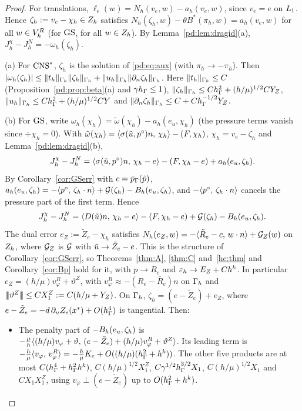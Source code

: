 \begin{proof}
For translations, $\ell_e(w)=N_h(v_e,w)-a_h(v_e,w)$, since $v_e=e$ on $L_1$. Hence $\zeta_h:=v_e-\chi_h\in Z_h$ satisfies $N_h(\zeta_h,w)-\theta B^\ast(\pi_h,w)=a_h(v_e,w)$ for all $w\in V_h^R$ (for $\mathrm{GS}$, for all $w\in Z_h$). By Lemma~\ref{pd:lem:dragid}(a), $J^\chi_h-J^N_h=-\omega_h(\zeta_h)$.

(a) For $\mathrm{CNS}^\ast$, $\zeta_h$ is the solution of \eqref{pd:eq:aux} (with $\pi_h\to-\pi_h$). Then $|\omega_h(\zeta_h)|\le\lVert t_h\rVert_{\Gamma_h}\lVert \zeta_h\rVert_{\Gamma_h}+\lVert u_h\rVert_{\Gamma_h}\lVert \partial_n\zeta_h\rVert_{\Gamma_h}$. Here $\lVert t_h\rVert_{\Gamma_h}\le C$ (Proposition~\ref{pd:prop:beta}(a) and $\gamma h_\Gamma\le1$), $\lVert \zeta_h\rVert_{\Gamma_h}\le Ch_\Gamma^2+(h/\mu)^{1/2}CY_Z$, $\lVert u_h\rVert_{\Gamma_h}\le Ch_\Gamma^2+(h/\mu)^{1/2}CY$ and $\lVert \partial_n\zeta_h\rVert_{\Gamma_h}\le C+Ch_\Gamma^{-1/2}Y_Z$.

(b) For $\mathrm{GS}$, write $\omega_h(\chi_h)=\tilde\omega(\chi_h)-a_h(e_u,\chi_h)$ (the pressure terms vanish since $\div\chi_h=0$). With $\tilde\omega(\chi_h)=\langle \sigma(\tilde u,p^\circ)n,\, \chi_h\rangle-(F,\chi_h)$, $\chi_h=v_e-\zeta_h$ and Lemma~\ref{pd:lem:dragid}(b),
\[
J^\chi_h-J^N_h=\langle \sigma(\tilde u,p^\circ)n,\, \chi_h-e\rangle-(F,\chi_h-e)+a_h(e_u,\zeta_h).
\]
By Corollary~\ref{cor:GSerr} with $c=\bar p_{\Gamma}(\tilde p)$, $a_h(e_u,\zeta_h)=-\langle p^\circ,\, \zeta_h\cdot n\rangle+\mathcal G(\zeta_h)-B_h(e_u,\zeta_h)$, and $-\langle p^\circ,\, \zeta_h\cdot n\rangle$ cancels the pressure part of the first term. Hence
\[
J^\chi_h-J^N_h=\langle D(\tilde u)n,\, \chi_h-e\rangle-(F,\chi_h-e)+\mathcal G(\zeta_h)-B_h(e_u,\zeta_h).
\]
The dual error $e_Z:=\tilde Z_e-\chi_h$ satisfies $N_h(e_Z,w)=-\langle \tilde R_e-c,\, w\cdot n\rangle+\mathcal G_Z(w)$ on $Z_h$, where $\mathcal G_Z$ is $\mathcal G$ with $\tilde u\to\tilde Z_e-e$. This is the structure of Corollary~\ref{cor:GSerr}, so Theorems~\ref{thm:A}, \ref{thm:C} and~\ref{hc:thm} and Corollary~\ref{cor:Bp} hold for it, with $p\to R_e$ and $\varepsilon_h\to E_Z+Ch^k$. In particular $e_Z=(h/\mu)v^R_\varphi+\vartheta^Z$, with $v^R_\varphi\approx-(R_e-\bar R_e)n$ on $\Gamma_h$ and $|\!|\!|\vartheta^Z|\!|\!|\le CX_1^Z:=C(h/\mu+Y_Z)$. On $\Gamma_h$, $\zeta_h=(e-\tilde Z_e)+e_Z$, where $e-\tilde Z_e=-d\,\partial_n Z_e(x^\ast)+O(h_\Gamma^4)$ is tangential. Then:
\begin{itemize}
\item The penalty part of $-B_h(e_u,\zeta_h)$ is $-\frac\mu h\langle (h/\mu)v_\varphi+\vartheta,\, (e-\tilde Z_e)+(h/\mu)v^R_\varphi+\vartheta^Z\rangle$. Its leading term is $-\frac h\mu\langle v_\varphi,\, v^R_\varphi\rangle=-\frac h\mu K_e+O((h/\mu)(h_\Gamma^2+h^k))$. The other five products are at most $C(h_\Gamma^4+h_\Gamma^2h^k)$, $C(h/\mu)^{1/2}X_1^Z$, $C\gamma^{1/2}h_\Gamma^{3/2}X_1$, $C(h/\mu)^{1/2}X_1$ and $CX_1X_1^Z$, using $v_\varphi\perp(e-\tilde Z_e)$ up to $O(h_\Gamma^2+h^k)$.

\end{itemize}
\end{proof}
